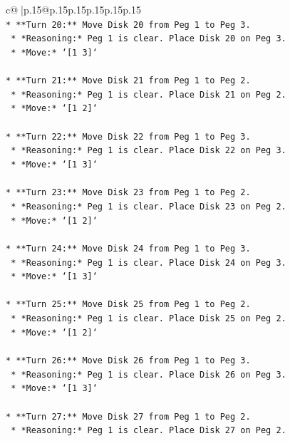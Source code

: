 \documentclass{article}
\begin{document}
{\begin{supertabular}{c@{$\;$}|p{.15\linewidth}@{}p{.15\linewidth}p{.15\linewidth}p{.15\linewidth}p{.15\linewidth}p{.15\linewidth}}
{{{\\ 
\texttt{*   **Turn 20:** Move Disk 20 from Peg 1 to Peg 3.} \\
\texttt{    *   *Reasoning:* Peg 1 is clear. Place Disk 20 on Peg 3.} \\
\texttt{    *   *Move:* `{[}1 3{]}`} \\
\\ 
\texttt{*   **Turn 21:** Move Disk 21 from Peg 1 to Peg 2.} \\
\texttt{    *   *Reasoning:* Peg 1 is clear. Place Disk 21 on Peg 2.} \\
\texttt{    *   *Move:* `{[}1 2{]}`} \\
\\ 
\texttt{*   **Turn 22:** Move Disk 22 from Peg 1 to Peg 3.} \\
\texttt{    *   *Reasoning:* Peg 1 is clear. Place Disk 22 on Peg 3.} \\
\texttt{    *   *Move:* `{[}1 3{]}`} \\
\\ 
\texttt{*   **Turn 23:** Move Disk 23 from Peg 1 to Peg 2.} \\
\texttt{    *   *Reasoning:* Peg 1 is clear. Place Disk 23 on Peg 2.} \\
\texttt{    *   *Move:* `{[}1 2{]}`} \\
\\ 
\texttt{*   **Turn 24:** Move Disk 24 from Peg 1 to Peg 3.} \\
\texttt{    *   *Reasoning:* Peg 1 is clear. Place Disk 24 on Peg 3.} \\
\texttt{    *   *Move:* `{[}1 3{]}`} \\
\\ 
\texttt{*   **Turn 25:** Move Disk 25 from Peg 1 to Peg 2.} \\
\texttt{    *   *Reasoning:* Peg 1 is clear. Place Disk 25 on Peg 2.} \\
\texttt{    *   *Move:* `{[}1 2{]}`} \\
\\ 
\texttt{*   **Turn 26:** Move Disk 26 from Peg 1 to Peg 3.} \\
\texttt{    *   *Reasoning:* Peg 1 is clear. Place Disk 26 on Peg 3.} \\
\texttt{    *   *Move:* `{[}1 3{]}`} \\
\\ 
\texttt{*   **Turn 27:** Move Disk 27 from Peg 1 to Peg 2.} \\
\texttt{    *   *Reasoning:* Peg 1 is clear. Place Disk 27 on Peg 2.} \\
}}}
\end{supertabular}}
\end{document}
